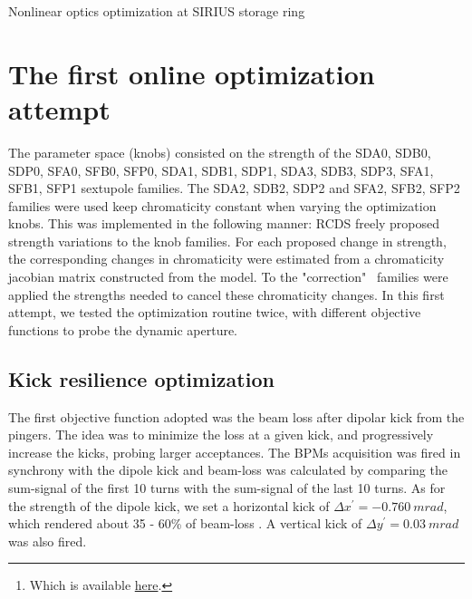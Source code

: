 \documentclass[a4paper,11pt]{article}
\begin{document}
\begin{center}
\LARGE{Nonlinear optics optimization at SIRIUS storage ring}  
\end{center}
\begin{abstract}
This document compiles the results of our attempts at online optimization of SIRIUS nonlinear optics so far. We have applied our own implementation of the Robust Conjugate Direction Search (RCDS)\footnote{Which is available \href{https://github.com/lnls-fac/apsuite/blob/589267dadd42e95b3da0093a8e03f5e7c9ae155d/apsuite/optimization/rcds.py}{here}.} algorithm to optimize the machine Dynamic Aperture (DA) by probing the Injection Efficiency. We also tried optimizing an objective consisting on the scalar combination of objective functions probing DA and momentum aperture (MA).
\end{abstract}
\section{The first online optimization attempt}
The parameter space (knobs) consisted on the strength of the SDA0, SDB0, SDP0, SFA0, SFB0, SFP0, SDA1, SDB1, SDP1, SDA3, SDB3, SDP3, SFA1, SFB1, SFP1 sextupole families. The SDA2, SDB2, SDP2 and SFA2, SFB2, SFP2 families were used keep chromaticity constant when varying the optimization knobs. This was implemented in the following manner: RCDS freely proposed strength variations to the knob families. For each proposed change in strength, the corresponding changes in chromaticity were estimated from a chromaticity jacobian matrix constructed from the model. To the "correction"~ families were applied the strengths needed to cancel these chromaticity changes. In this first attempt, we tested the optimization routine twice, with different objective functions to probe the dynamic aperture.
\subsection{Kick resilience optimization}
The first objective function adopted was the beam loss after dipolar kick from the pingers. The idea was to minimize the loss at a given kick, and progressively increase the kicks, probing larger acceptances. The BPMs acquisition was fired in synchrony with the dipole kick and beam-loss was calculated by comparing the sum-signal of the first 10 turns with the sum-signal of the last 10 turns. As for the strength of the dipole kick, we set a horizontal kick of $\Delta x^\prime = -0.760~ \unit{m rad}$, which rendered about 35 - 60\% of beam-loss . A vertical kick of $\Delta y^\prime = 0.03~\unit{m rad}$ was also fired.
\end{document}

